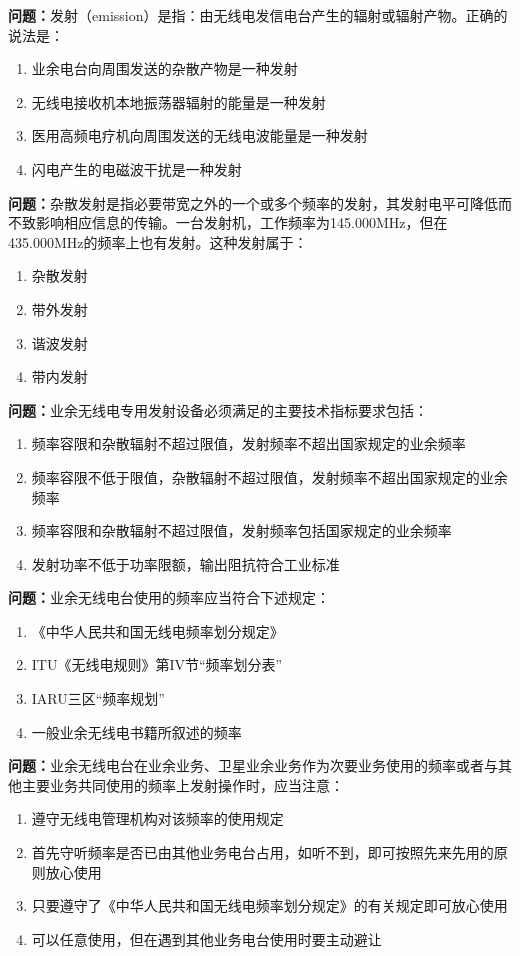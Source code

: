 \textbf{问题：}发射（emission）是指：由无线电发信电台产生的辐射或辐射产物。正确的说法是：
\begin{enumerate}[label=\Alph*), leftmargin=3em]
	\item 业余电台向周围发送的杂散产物是一种发射
	\item 无线电接收机本地振荡器辐射的能量是一种发射
	\item 医用高频电疗机向周围发送的无线电波能量是一种发射
	\item 闪电产生的电磁波干扰是一种发射
\end{enumerate}

\textbf{问题：}杂散发射是指必要带宽之外的一个或多个频率的发射，其发射电平可降低而不致影响相应信息的传输。一台发射机，工作频率为145.000MHz，但在435.000MHz的频率上也有发射。这种发射属于：
\begin{enumerate}[label=\Alph*), leftmargin=3em]
	\item 杂散发射
	\item 带外发射
	\item 谐波发射
	\item 带内发射
\end{enumerate}

\textbf{问题：}业余无线电专用发射设备必须满足的主要技术指标要求包括：
\begin{enumerate}[label=\Alph*), leftmargin=3em]
	\item 频率容限和杂散辐射不超过限值，发射频率不超出国家规定的业余频率
	\item 频率容限不低于限值，杂散辐射不超过限值，发射频率不超出国家规定的业余频率
	\item 频率容限和杂散辐射不超过限值，发射频率包括国家规定的业余频率
	\item 发射功率不低于功率限额，输出阻抗符合工业标准
\end{enumerate}

\textbf{问题：}业余无线电台使用的频率应当符合下述规定：
\begin{enumerate}[label=\Alph*), leftmargin=3em]
	\item 《中华人民共和国无线电频率划分规定》
	\item ITU《无线电规则》第IV节“频率划分表”
	\item IARU三区“频率规划”
	\item 一般业余无线电书籍所叙述的频率
\end{enumerate}

\textbf{问题：}业余无线电台在业余业务、卫星业余业务作为次要业务使用的频率或者与其他主要业务共同使用的频率上发射操作时，应当注意：
\begin{enumerate}[label=\Alph*), leftmargin=3em]
	\item 遵守无线电管理机构对该频率的使用规定
	\item 首先守听频率是否已由其他业务电台占用，如听不到，即可按照先来先用的原则放心使用
	\item 只要遵守了《中华人民共和国无线电频率划分规定》的有关规定即可放心使用
	\item 可以任意使用，但在遇到其他业务电台使用时要主动避让
\end{enumerate}

